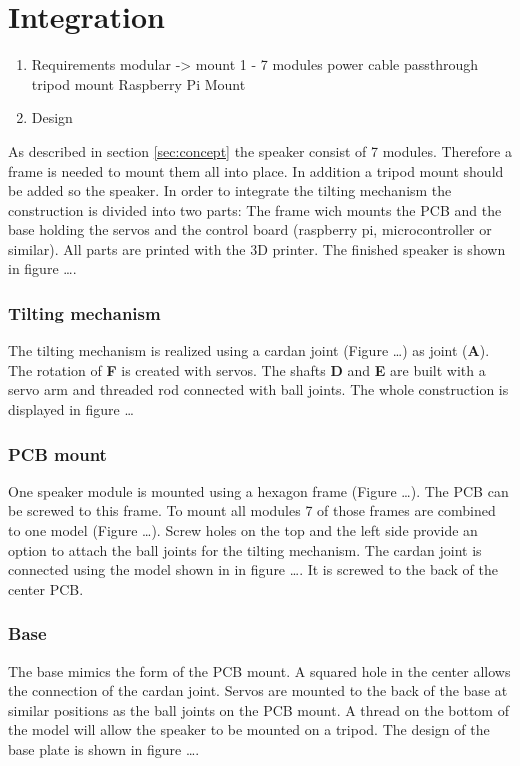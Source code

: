 \section{Integration}

\begin{enumerate}
  \item Requirements
  \subitem modular -> mount 1 - 7 modules
  \subitem power cable passthrough
  \subitem tripod mount
  \subitem Raspberry Pi Mount
  \item Design
\end{enumerate}

As described in section \ref{sec:concept} the speaker consist of 7 modules. Therefore a frame is needed to mount them all into place. In addition a tripod mount should be added so the speaker. In order to integrate the tilting mechanism the construction is divided into two parts: The frame wich mounts the PCB and the base holding the servos and the control board (raspberry pi, microcontroller or similar). All parts are printed with the 3D printer. The finished speaker is shown in figure \dots.

\subsubsection*{Tilting mechanism}

The tilting mechanism is realized using a cardan joint (Figure \dots) as joint (\textbf{A}). The rotation of \textbf{F} is created with servos. The shafts \textbf{D} and \textbf{E} are built with a servo arm and threaded rod connected with ball joints. The whole construction is displayed in figure \dots

\subsubsection*{PCB mount}

One speaker module is mounted using a hexagon frame (Figure \dots). The PCB can be screwed to this frame. To mount all modules 7 of those frames are combined to one model (Figure \dots). Screw holes on the top and the left side provide an option to attach the ball joints for the tilting mechanism. The cardan joint is connected using the model shown in in figure \dots. It is screwed to the back of the center PCB.

\subsubsection*{Base}

The base mimics the form of the PCB mount. A squared hole in the center allows the connection of the cardan joint. Servos are mounted to the back of the base at similar positions as the ball joints on the PCB mount. A thread on the bottom of the model will allow the speaker to be mounted on a tripod. The design of the base plate is shown in figure \dots.